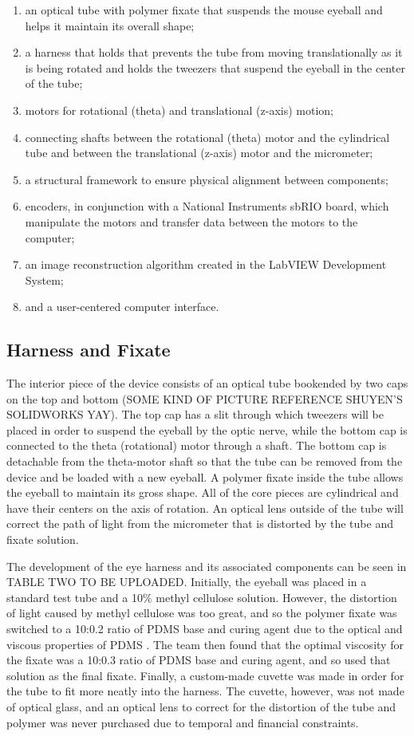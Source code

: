 \documentclass{article}
\begin{document}
\begin{enumerate}
 \item an optical tube with polymer fixate that suspends the mouse eyeball and helps it maintain its overall shape; 
\item a harness that holds that prevents the tube from moving translationally as it is being rotated and holds the tweezers that suspend the eyeball in the center of the tube;
\item motors for rotational (theta) and translational (z-axis) motion; 
\item connecting shafts between the rotational (theta) motor and the cylindrical tube and between the translational (z-axis) motor and the micrometer;
\item a structural framework to ensure physical alignment between components; 
\item encoders, in conjunction with a National Instruments sbRIO board, which manipulate the motors and transfer data between the motors to the computer;  
\item an image reconstruction algorithm created in the LabVIEW Development System;
\item and a user-centered computer interface. 
\end{enumerate}

\subsection{Harness and Fixate}
\label{sec:harness}
	The interior piece of the device consists of an optical tube bookended by two caps on the top and bottom (SOME KIND OF PICTURE REFERENCE SHUYEN’S SOLIDWORKS YAY).  The top cap has a slit through which tweezers will be placed in order to suspend the eyeball by the optic nerve, while the bottom cap is connected to the theta (rotational) motor through a shaft. The bottom cap is detachable from the theta-motor shaft so that the tube can be removed from the device and be loaded with a new eyeball. A polymer fixate inside the tube allows the eyeball to maintain its gross shape.  All of the core pieces are cylindrical and have their centers on the axis of rotation. An optical lens outside of the tube will correct the path of light from the micrometer that is distorted by the tube and fixate solution.
	
The development of the eye harness and its associated components can be seen in TABLE TWO TO BE UPLOADED. Initially, the eyeball was placed in a standard test tube and a 10\% methyl cellulose solution. However, the distortion of light caused by methyl cellulose was too great, and so the polymer fixate was switched to a 10:0.2 ratio of PDMS base and curing agent due to the optical and viscous properties of PDMS . The team then found that the optimal viscosity for the fixate was a 10:0.3 ratio of PDMS base and curing agent, and so used that solution as the final fixate. Finally, a custom-made cuvette was made in order for the tube to fit more neatly into the harness. The cuvette, however, was not made of optical glass, and an optical lens to correct for the distortion of the tube and polymer was never purchased due to temporal and financial constraints. 
	
\end{document}
